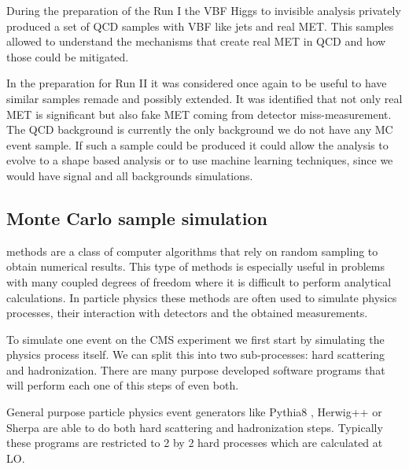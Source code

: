 During the preparation of the Run I the \gls{VBF} Higgs to invisible analysis privately produced a set of \gls{QCD} samples with \gls{VBF} like jets and real \gls{MET}. This samples allowed to understand the mechanisms that create real \gls{MET} in \gls{QCD} and how those could be mitigated. 

In the preparation for Run II it was considered once again to be useful to have similar samples remade and possibly extended. It was identified that not only real \gls{MET} is significant but also fake \gls{MET} coming from detector miss-measurement. The \gls{QCD} background is currently the only background we do not have any \gls{MC} event sample. If such a sample could be produced it could allow the analysis to evolve to a shape based analysis or to use machine learning techniques, since we would have signal and all backgrounds simulations. 

\subsection{Monte Carlo sample simulation}
\label{SUBSECTION:RunIIPreparation_MonteCarloSampleSimulation}


 methods are a class of computer algorithms that rely on random sampling to obtain numerical results. This type of methods is especially useful in problems with many coupled degrees of freedom where it is difficult to perform analytical calculations. In particle physics these methods are often used to simulate physics processes, their interaction with detectors and the obtained measurements.

To simulate one event on the \gls{CMS} experiment we first start by simulating the physics process itself. We can split this into two sub-processes: hard scattering and hadronization. There are many purpose developed software programs that will perform each one of this steps of even both. 

General purpose particle physics event generators like Pythia8 \cite{ARTICLE:Pythia6p4PhysicsAndManual,ARTICLE:Pythia8p1Introduction}, Herwig++ \cite{ARTICLE:HERWIGPhysicsAndManual} or Sherpa \cite{ARTiCLE:SherpaEventGenerator} are able to do both hard scattering and hadronization steps. Typically these programs are restricted to 2 by 2 hard processes which are calculated at \gls{LO}. 

